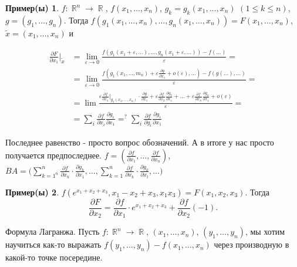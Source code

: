 \documentclass[a4paper,100pt]{article}
\theoremstyle{indented}
\theoremstyle{definition}
\newtheorem{exl}{Пример(ы)}
\theoremstyle{remark}
\DeclareMathOperator{\RR}{\mathbb{R}}
\begin{document}
\begin{exl}
    $f:\RR^n\rightarrow \RR$, $f(x_1, \ldots, x_n)$, $g_k= g_k(x_1, \ldots, x_n)$ $(1\leq k\leq n)$, $g=(g_1, \ldots, g_n)$. Тогда $f(g_1(x_1, \ldots, x_n), \ldots, g_n(x_1, \ldots, x_n))=F(x_1, \ldots, x_n)$, $\tilde{x} = (x_1, \ldots, x_n)$ и 
    
\begin{equation*}
    \begin{aligned}
            \frac{\partial F}{\partial x_1}\bigg|_{\tilde{x}} & = \lim_{\varepsilon \rightarrow 0}\frac{f(g_1(x_1+\varepsilon, \ldots), \ldots, g_n(x_1+\varepsilon, \ldots))- f(\ldots)}{\varepsilon} = \\
            & = \lim_{\varepsilon\rightarrow 0}\frac{f(g_1(x_1, \ldots, m_n)+\varepsilon\frac{\partial g}{\partial x_1}+o(\varepsilon), \ldots)-f(g(\ldots), \ldots)}{\varepsilon} = \\ 
            & = \lim\frac{\varepsilon\frac{\partial f}{\partial x_1}\bigg|_{g_1(x_1, \ldots, x_n)}\cdot\frac{\partial g}{\partial x_1}+\varepsilon\frac{\partial f}{\partial x_2}\frac{\partial g_2}{\partial x_1}+\ldots+\varepsilon\frac{\partial f}{\partial x_n}\frac{\partial g_n}{\partial x_1}+o(\varepsilon)}{\varepsilon} = \\ 
            & = \sum_i \frac{\partial f}{\partial x_i}\frac{\partial g_i}{\partial x_1} =^? \sum_i \frac{\partial f}{\partial g_i}\frac{\partial g_i}{\partial x_1}
    \end{aligned}
\end{equation*}

    Последнее равенство - просто вопрос обозначений. А в итоге у нас просто получается предпоследнее. $f=(\frac{\partial f}{\partial x_1}, \ldots, \frac{\partial f}{\partial x_n})$, $BA=\biggl(\sum_{k=1^n}^n\frac{\partial f}{\partial x_k}\cdot \frac{\partial g_k}{\partial x_1}, \ldots, \sum_{k=1}^n \frac{\partial f}{\partial x_k}\cdot \frac{\partial g_k}{\partial x_l}, \ldots \biggr)$
\end{exl}

\begin{exl}
    $f(e^{x_1+x_2+x_3}, x_1-x_2+x_3, x_1x_3) = F(x_1, x_2, x_3)$. Тогда 
    \[
        \frac{\partial F}{\partial x_2}= \frac{\partial f}{\partial x_1}\cdot e^{x_1+x_2+x_3}+\frac{\partial f}{\partial x_2}(-1). 
    \]
\end{exl}

Формула Лагранжа. Пусть $f:\RR^n\rightarrow \RR$, $(x_1, \ldots, x_n)$, $(y_1, \ldots, y_n)$, мы хотим научиться как-то выражать $f(y_1, \ldots, y_n)- f(x_1, \ldots, x_n)$ через производную в какой-то точке посередине. \ 
\end{document}

